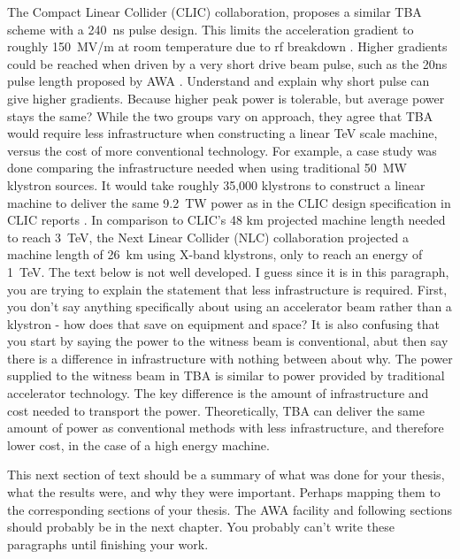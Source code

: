 \documentclass{iitthesis}
\newcommand{\lsnote}[1]{\textsf{{\color{violet}{ LS note:}   #1 }}}
\newcommand{\nrnote}[1]{\textsf{{\color{blue}{ NN note:}   #1 }}}
\begin{document}
The Compact Linear Collider (CLIC) collaboration, proposes a similar TBA scheme with
a \SI{240}{ns} pulse design. This limits the acceleration gradient
to roughly \SI{150}{MV/m} at room temperature due to rf breakdown \cite{CLICdesignReport}.
Higher gradients could be reached when driven by a very short drive
beam pulse, such as the 20ns pulse length proposed by AWA \cite{WeiPaper}. 
\nrnote{Understand and explain why short pulse can give higher gradients. 
Because higher peak power is tolerable, but average power stays the same?}
While the two groups vary on approach, they agree that TBA would 
require less infrastructure when constructing a linear TeV scale machine, 
versus the cost of more conventional technology. 
For example, a case study was done comparing the infrastructure 
needed when using traditional \SI{50}{MW} klystron sources.
It would take roughly 35,000 klystrons to construct a linear machine to deliver the same 
\SI{9.2}{TW} power as in the CLIC design specification in CLIC reports \cite{CLICdesignReport}. 
In comparison to CLIC's 48 km projected machine length needed to reach \SI{3}{TeV}, the Next Linear
Collider (NLC) collaboration projected a machine length of \SI{26}{km} using X-band klystrons,
only to reach an energy of \SI{1}{TeV}. %
\lsnote{The text below is not well developed.  I guess since it is in this paragraph, you are trying to explain the statement that less infrastructure is required.  First, you don't say anything specifically about using an accelerator beam rather than a klystron - how does that save on equipment and space?  It is also confusing that you start by saying the power to the witness beam is conventional, abut then say there is a difference in infrastructure with nothing between  about why.}
The power supplied to the witness beam in TBA is similar to
power provided by traditional accelerator technology. 
The key difference is the amount of infrastructure and cost 
needed to transport the power. Theoretically, TBA can deliver
the same amount of power as conventional methods with less 
infrastructure, and therefore lower cost, in the case of a high energy machine. 

\lsnote{This next section of text should be a summary of what was done for your thesis, what the results were, and why they were important. Perhaps mapping them to the corresponding sections of your thesis.  The AWA facility and following sections should probably be in the next chapter.  You probably can't write these paragraphs until finishing your work.}
\end{document}
